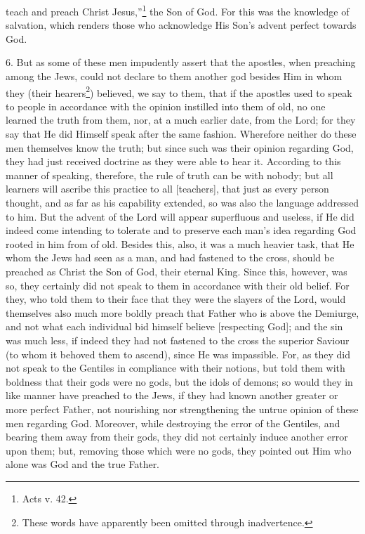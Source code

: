 teach and preach Christ Jesus,”\footnote{Acts v. 42.} the Son of God. For this was the knowledge of salvation, which renders those who acknowledge His Son’s advent perfect towards God.

6. But as some of these men impudently assert that the apostles, when preaching among the Jews, could not declare to them another god besides Him in whom they (their hearers\footnote{These words have apparently been omitted through inadvertence.}) believed, we say to them, that if the apostles used to speak to people in accordance with the opinion instilled into them of old, no one learned the truth from them, nor, at a much earlier date, from the Lord; for they say that He did Himself speak after the same fashion. Wherefore neither do these men themselves know the truth; but since such was their opinion regarding God, they had just received doctrine as they were able to hear it. According to this manner of speaking, therefore, the rule of truth can be with nobody; but all learners will ascribe this practice to all [teachers], that just as every person thought, and as far as his capability extended, so was also the language addressed to him. But the advent of the Lord will appear superfluous and useless, if He did indeed come intending to tolerate and to preserve each man’s idea regarding God rooted in him from of old. Besides this, also, it was a much heavier task, that He whom the Jews had seen as a man, and had fastened to the cross, should be preached as Christ the Son of God, their eternal King. Since this, however, was so, they certainly did not speak to them in accordance with their old belief. For they, who told them to their face that they were the slayers of the Lord, would themselves also much more boldly preach that Father who is above the Demiurge, and not what each individual bid himself believe [respecting God]; and the sin was much less, if indeed they had not fastened to the cross the superior Saviour (to whom it behoved them to ascend), since He was impassible. For, as they did not speak to the Gentiles in compliance with their notions, but told them with boldness that their gods were no gods, but the idols of demons; so would they in like manner have preached to the Jews, if they had known another greater or more perfect Father, not nourishing nor strengthening the untrue opinion of these men regarding God. Moreover, while destroying the error of the Gentiles, and bearing them away from their gods, they did not certainly induce another error upon them; but, removing those which were no gods, they pointed out Him who alone was God and the true Father.


